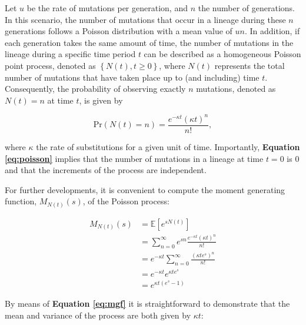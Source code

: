 Let $u$ be the rate of mutations per generation, and $n$ the number of generations. In this scenario, the number of mutations that occur in a lineage during these $n$ generations follows a Poisson distribution with a mean value of $un$. In addition, if each generation takes the same amount of time, the number of mutations in the lineage during a specific time period $t$ can be described as a homogeneous Poisson point process, denoted as $\left\{N(t), t \geq 0\right\}$, where $N(t)$ represents the total number of mutations that have taken place up to (and including) time $t$. Consequently, the probability of observing exactly $n$ mutations, denoted as $N(t) = n$ at time $t$, is given by

\begin{equation}
    \text{Pr}(N(t) = n) = \frac{e^{-\kappa t}\left(\kappa t\right)^n}{n!}\label{eq:poisson},
\end{equation}

\noindent where $\kappa$ the rate of substitutions for a given unit of time. Importantly, \textbf{Equation \ref{eq:poisson}} implies that the number of mutations in a lineage at time $t = 0$ is $0$ and that the increments of the process are independent.

For further developments, it is convenient to compute the moment generating function, $M_{N(t)}(s)$, of the Poisson process:

\begin{align}
    M_{N(t)}(s) &= \mathbb{E}\left[e^{sN(t)}\right]\\
    &= \sum_{n=0}^{\infty} e^{sn} \frac{e^{-\kappa t}\left(\kappa t\right)^n}{n!}\nonumber\\
    &= e^{-\kappa t} \sum_{n=0}^{\infty} \frac{\left(\kappa t e^s\right)^n}{n!}\nonumber\\
    &= e^{-\kappa t} e^{\kappa t e^s}\nonumber\\
    &= e^{\kappa t (e^s - 1)}\label{eq:mgf}
\end{align}

By means of \textbf{Equation \ref{eq:mgf}} it is straightforward to demonstrate that the mean and variance of the process are both given by $\kappa t$:

